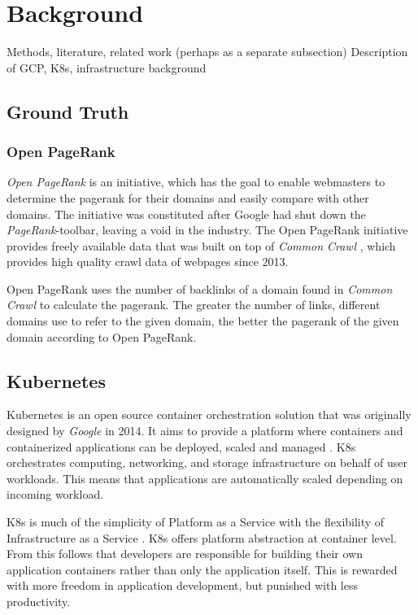 \section{Background}
Methods, literature, related work (perhaps as a separate subsection)
Description of GCP, K8s, infrastructure background

\subsection{Ground Truth}
\subsubsection{Open PageRank}
\label{OpenPageRank}
\textit{Open PageRank} \cite{OpenPageRank} is an initiative, which has the goal to enable webmasters to determine the pagerank for their domains and easily compare with other domains. The initiative was constituted after Google had shut down the \textit{PageRank}-toolbar, leaving a void in the industry. The Open PageRank initiative provides freely available data that was built on top of \textit{Common Crawl} \cite{CommonCrawl}, which provides high quality crawl data of webpages since 2013.

Open PageRank uses the number of backlinks of a domain found in \textit{Common Crawl} to calculate the pagerank. The greater the number of links, different domains use to refer to the given domain, the better the pagerank of the given domain according to Open PageRank.

\subsection{Kubernetes \cite{SAPTerraformSamed}}
Kubernetes is an open source container orchestration solution that was originally designed by \textit{Google} in 2014. It aims to provide a platform where containers and containerized applications can be deployed, scaled and managed \cite{Wikik8s}. K8s orchestrates computing, networking, and storage infrastructure on behalf of user workloads. This means that applications are automatically scaled depending on incoming workload.

K8s is much of the simplicity of Platform as a Service with the flexibility of Infrastructure as a Service \cite{k8s}. K8s offers platform abstraction at container level. From this follows that developers are responsible for building their own application containers rather than only the application itself. This is rewarded with more freedom in application development, but punished with less productivity.

